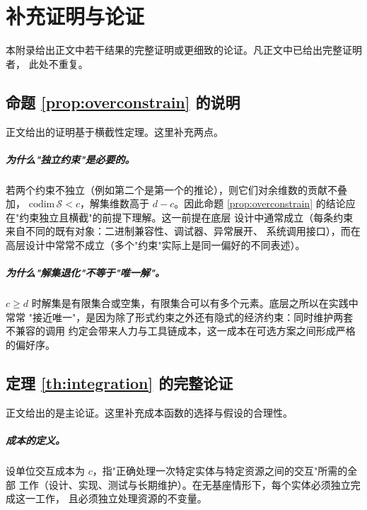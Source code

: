 \appendix

\chapter{补充证明与论证}\label{app:proofs}

本附录给出正文中若干结果的完整证明或更细致的论证。凡正文中已给出完整证明者，
此处不重复。

\section{命题 \ref{prop:overconstrain} 的说明}

正文给出的证明基于横截性定理。这里补充两点。

\paragraph{为什么"独立约束"是必要的。}
若两个约束不独立（例如第二个是第一个的推论），则它们对余维数的贡献不叠加，
$\mathrm{codim}\,\mathcal{S} < c$，解集维数高于 $d - c$。因此命题
\ref{prop:overconstrain} 的结论应在"约束独立且横截"的前提下理解。这一前提在底层
设计中通常成立（每条约束来自不同的既有对象：二进制兼容性、调试器、异常展开、
系统调用接口），而在高层设计中常常不成立（多个"约束"实际上是同一偏好的不同表述）。

\paragraph{为什么"解集退化"不等于"唯一解"。}
$c \ge d$ 时解集是有限集合或空集，有限集合可以有多个元素。底层之所以在实践中常常
"接近唯一"，是因为除了形式约束之外还有隐式的经济约束：同时维护两套不兼容的调用
约定会带来人力与工具链成本，这一成本在可选方案之间形成严格的偏好序。

\section{定理 \ref{th:integration} 的完整论证}

正文给出的是主论证。这里补充成本函数的选择与假设的合理性。

\paragraph{成本的定义。}
设单位交互成本为 $c$，指"正确处理一次特定实体与特定资源之间的交互"所需的全部
工作（设计、实现、测试与长期维护）。在无基座情形下，每个实体必须独立完成这一工作，
且必须独立处理资源的不变量。

